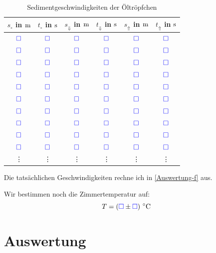 \documentclass[11pt]{article}
\newcommand{\emesswert}{\left(\messwert \pm \messwert \right)}
\newcommand{\messwert}{\textcolor{blue}{\square}}
\begin{document}
\begin{table}[h!]
	\centering

	\begin{tabular}{cccccc}
		$s_\circ$ in $\unit m$ & $t_\circ$ in $\unit s$ & $s_\Downarrow$ in $\unit m$ & $t_\Downarrow$ in $\unit s$ & $s_\Uparrow$ in $\unit m$ & $t_\Uparrow$ in $\unit s$ \\
		\hline \hline
		$\messwert$ & $\messwert$ & $\messwert$ & $\messwert$ & $\messwert$ & $\messwert$\\
		$\messwert$ & $\messwert$ & $\messwert$ & $\messwert$ & $\messwert$ & $\messwert$\\
		$\messwert$ & $\messwert$ & $\messwert$ & $\messwert$ & $\messwert$ & $\messwert$\\
		$\messwert$ & $\messwert$ & $\messwert$ & $\messwert$ & $\messwert$ & $\messwert$\\
		$\messwert$ & $\messwert$ & $\messwert$ & $\messwert$ & $\messwert$ & $\messwert$\\
		\hline
		$\messwert$ & $\messwert$ & $\messwert$ & $\messwert$ & $\messwert$ & $\messwert$\\
		$\messwert$ & $\messwert$ & $\messwert$ & $\messwert$ & $\messwert$ & $\messwert$\\
		$\messwert$ & $\messwert$ & $\messwert$ & $\messwert$ & $\messwert$ & $\messwert$\\
		$\messwert$ & $\messwert$ & $\messwert$ & $\messwert$ & $\messwert$ & $\messwert$\\
		$\messwert$ & $\messwert$ & $\messwert$ & $\messwert$ & $\messwert$ & $\messwert$\\
		\hline
				\vdots & \vdots & \vdots & \vdots & \vdots & \vdots
	\end{tabular}

	\caption{Sedimentgeschwindigkeiten der Öltröpfchen}
	\label{table:sediment1}
\end{table}

Die tatsächlichen Geschwindigkeiten rechne ich in \ref{Auswertung-f} aus.

Wir bestimmen noch die Zimmertemperatur auf:
\[ T = \unit[\emesswert]{^\circ C} \]


\section{Auswertung}
\end{document}

